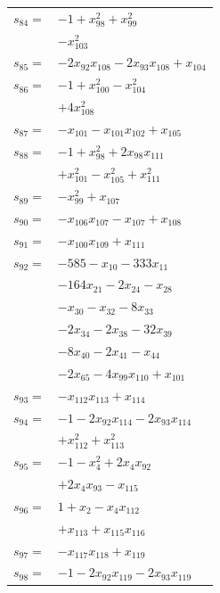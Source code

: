 \begin{longtable}{@{}r@{\;}l@{}}
\(s_{84}=\) & \(\displaystyle -1 +x_{98}^{2} +x_{99}^{2}\) \\
 & \(\displaystyle -x_{103}^{2}\) \\[3pt]
\(s_{85}=\) & \(\displaystyle -2x_{92}x_{108} -2x_{93}x_{108} +x_{104}\) \\[3pt]
\(s_{86}=\) & \(\displaystyle -1 +x_{100}^{2} -x_{104}^{2}\) \\
 & \(\displaystyle +4x_{108}^{2}\) \\[3pt]
\(s_{87}=\) & \(\displaystyle -x_{101} -x_{101}x_{102} +x_{105}\) \\[3pt]
\(s_{88}=\) & \(\displaystyle -1 +x_{98}^{2} +2x_{98}x_{111}\) \\
 & \(\displaystyle +x_{101}^{2} -x_{105}^{2} +x_{111}^{2}\) \\[3pt]
\(s_{89}=\) & \(\displaystyle -x_{99}^{2} +x_{107}\) \\[3pt]
\(s_{90}=\) & \(\displaystyle -x_{106}x_{107} -x_{107} +x_{108}\) \\[3pt]
\(s_{91}=\) & \(\displaystyle -x_{100}x_{109} +x_{111}\) \\[3pt]
\(s_{92}=\) & \(\displaystyle -585 -x_{10} -333x_{11}\) \\
 & \(\displaystyle -164x_{21} -2x_{24} -x_{28}\) \\
 & \(\displaystyle -x_{30} -x_{32} -8x_{33}\) \\
 & \(\displaystyle -2x_{34} -2x_{38} -32x_{39}\) \\
 & \(\displaystyle -8x_{40} -2x_{41} -x_{44}\) \\
 & \(\displaystyle -2x_{65} -4x_{99}x_{110} +x_{101}\) \\[3pt]
\(s_{93}=\) & \(\displaystyle -x_{112}x_{113} +x_{114}\) \\[3pt]
\(s_{94}=\) & \(\displaystyle -1 -2x_{92}x_{114} -2x_{93}x_{114}\) \\
 & \(\displaystyle +x_{112}^{2} +x_{113}^{2}\) \\[3pt]
\(s_{95}=\) & \(\displaystyle -1 -x_{4}^{2} +2x_{4}x_{92}\) \\
 & \(\displaystyle +2x_{4}x_{93} -x_{115}\) \\[3pt]
\(s_{96}=\) & \(\displaystyle 1 +x_{2} -x_{4}x_{112}\) \\
 & \(\displaystyle +x_{113} +x_{115}x_{116}\) \\[3pt]
\(s_{97}=\) & \(\displaystyle -x_{117}x_{118} +x_{119}\) \\[3pt]
\(s_{98}=\) & \(\displaystyle -1 -2x_{92}x_{119} -2x_{93}x_{119}\) \\

\end{longtable}
